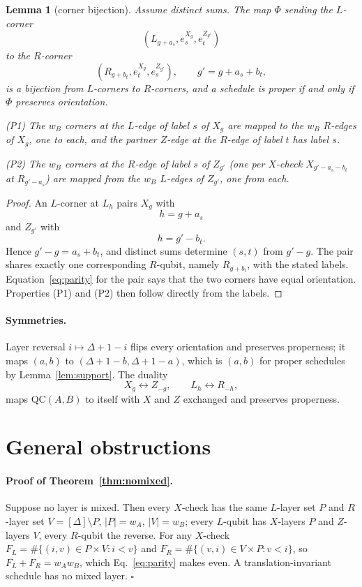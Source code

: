 \documentclass[reprint,twocolumn,superscriptaddress,nofootinbib]{revtex4-2}
\theoremstyle{plain}
\newtheorem*{lemmaSI}{Lemma}
\newcommand{\wA}{w_A}                  %
\newcommand{\wB}{w_B}
\begin{document}
\begin{lemmaSI}[corner bijection]
Assume distinct sums. The map $\Phi$ sending the $L$-corner
\[
(L_{g+a_s},e^{X_g}_s,e^{Z_{g'}}_t)
\]
to the $R$-corner
\[
(R_{g+b_t},e^{X_g}_t,e^{Z_{g'}}_s),
\qquad
g'=g+a_s+b_t,
\]
is a bijection from $L$-corners to $R$-corners, and a schedule is proper
if and only if $\Phi$ preserves orientation.

\emph{(P1)} The $\wB$ corners at the $L$-edge of label $s$ of $X_g$ are
mapped to the $\wB$ $R$-edges of $X_g$, one to each, and the partner
$Z$-edge at the $R$-edge of label $t$ has label $s$.

\emph{(P2)} The $\wB$ corners at the $R$-edge of label $s$ of $Z_{g'}$
(one per $X$-check $X_{g'-a_s-b_t}$ at $R_{g'-a_s}$) are mapped from the
$\wB$ $L$-edges of $Z_{g'}$, one from each.
\end{lemmaSI}

\begin{proof}
An $L$-corner at $L_h$ pairs $X_g$ with
\[
h=g+a_s
\]
and $Z_{g'}$ with
\[
h=g'-b_t.
\]
Hence $g'-g=a_s+b_t$, and distinct sums determine $(s,t)$ from $g'-g$.
The pair shares exactly one corresponding $R$-qubit, namely
$R_{g+b_t}$, with the stated labels. Equation~\eqref{eq:parity} for the
pair says that the two corners have equal orientation. Properties (P1)
and (P2) then follow directly from the labels.
\end{proof}

\paragraph*{Symmetries.}
Layer reversal $i\mapsto\Delta+1-i$ flips every orientation and preserves
properness; it maps $(a,b)$ to $(\Delta+1-b,\Delta+1-a)$, which is $(a,b)$
for proper schedules by Lemma~\ref{lem:support}. The duality
\[
X_g\leftrightarrow Z_{-g},
\qquad
L_h\leftrightarrow R_{-h},
\]
maps $\mathrm{QC}(A,B)$ to itself with $X$ and $Z$ exchanged and
preserves properness.

\section{General obstructions}
\label{si:obstructions}

\paragraph*{Proof of Theorem~\ref{thm:nomixed}.}
Suppose no layer is mixed. Then every $X$-check has the same $L$-layer set
$P$ and $R$-layer set $V=[\Delta]\setminus P$, $|P|=\wA$, $|V|=\wB$; every
$L$-qubit has $X$-layers $P$ and $Z$-layers $V$, every $R$-qubit the
reverse. For any $X$-check $F_L=\#\{(i,v)\in P\times V:i<v\}$ and
$F_R=\#\{(v,i)\in V\times P:v<i\}$, so $F_L+F_R=\wA\wB$, which
Eq.~\eqref{eq:parity} makes even. A translation-invariant schedule has no
mixed layer. \hfill$\square$
\end{document}
